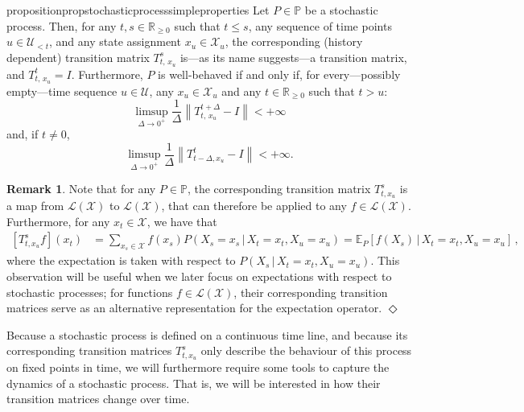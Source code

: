 \documentclass[10pt,a4paper]{paper}
\theoremstyle{definition}
\newtheorem{remark}{Remark}
\newcommand{\reals}{\mathbb{R}}
\newcommand{\realsnonneg}{\reals_{\geq 0}}
\newcommand{\states}{\mathcal{X}}
\newcommand{\processes}{\mathbb{P}}
\newcommand{\gambles}{\mathcal{L}}
\newcommand{\gamblesX}{\gambles(\states)}
\newcommand{\norm}[1]{\left\lVert #1 \right\rVert}
\newcommand{\exampleend}{\hfill$\Diamond$}
\begin{document}
\begin{restatable}{proposition}{propstochasticprocesssimpleproperties}
\label{prop:stochasticprocess:simpleproperties}
Let $P\in\processes$ be a stochastic process.  
Then, for any $t,s\in\realsnonneg$ such that $t\leq s$, any sequence of time points $u\in\mathcal{U}_{<t}$, and any state assignment $x_u\in\states_u$, the corresponding (history dependent) transition matrix $T_{t,\,x_u}^s$ is---as its name suggests---a transition matrix, and $T_{t,\,x_u}^t=I$. Furthermore, $P$ is well-behaved if and only if, for every---possibly empty---time sequence $u\in\mathcal{U}$, any $x_u\in\states_u$ and any $t\in\reals_{\geq0}$ such that $t>u$:
\begin{equation}\label{eq:def:well-behaved:right:matrix}
\limsup_{\Delta\to 0^{+}}\frac{1}{\Delta}\norm{T_{t,\,x_u}^{t+\Delta}-I}<+\infty
\end{equation}
and, if $t\neq0$,
\begin{equation}\label{eq:def:well-behaved:left:matrix}
\limsup_{\Delta\to 0^{+}}\frac{1}{\Delta}\norm{T_{t-\Delta,x_u}^{t}-I}<+\infty.
\end{equation}
\vspace{-4pt}
\end{restatable}

\begin{remark}\label{remark:expectationT}
Note that for any $P\in\processes$, the corresponding transition matrix $T_{t, x_u}^s$ is a map from $\gamblesX$ to $\gamblesX$, that can therefore be applied to any $f\in\gamblesX$. Furthermore, for any $x_t\in\states$, we have that
\begin{align*}
\left[T_{t,x_u}^sf\right](x_t) &= \sum_{x_s\in\states}f(x_s)P(X_s=x_s\,\vert\,X_t=x_t,X_u=x_u)= \mathbb{E}_P\left[f(X_s)\,\vert\,X_t=x_t, X_u=x_u\right]\,,
\end{align*}
where the expectation is taken with respect to $P(X_s\,\vert\,X_t=x_t,X_u=x_u)$. This observation will be useful when we later focus on expectations with respect to stochastic processes; for functions $f\in\gamblesX$, their corresponding transition matrices serve as an alternative representation for the expectation operator. 
\exampleend
\end{remark}

Because a stochastic process is defined on a continuous time line, and because its corresponding transition matrices $T_{t,x_u}^s$ only describe the behaviour of this process on fixed points in time, we will furthermore require some tools to capture the dynamics of a stochastic process. That is, we will be interested in how their transition matrices change over time.
\end{document}
